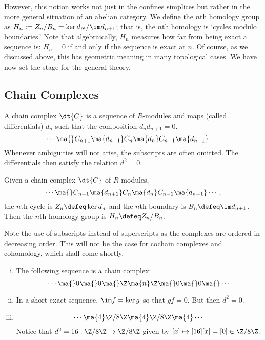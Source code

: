 However, this notion works not just in the confines simplices but rather in the more general situation of an abelian category. We define the $n$th homology group as $H_n:=Z_n/B_n=\ker d_N/\im d_{n+1}$; that is, the $n$th homology is `cycles modulo boundaries.' Note that algebraically, $H_n$ measures how far from being exact a sequence is: $H_n=0$ if and only if the sequence is exact at $n$. Of course, as we discussed above, this has geometric meaning in many topological cases. We have now set the stage for the general theory. 



\subsection{Chain Complexes} 



\begin{dfn}
A chain complex $\dt{C}$ is a sequence of $R$-modules and maps (called differentials) $d_n$ such that the composition $d_nd_{n+1}=0$.
	\[
	\cdots \ma{} C_{n+1} \ma{d_{n+1}} C_n \ma{d_n} C_{n-1} \ma{d_{n-1}} \cdots
	\]
Whenever ambiguities will not arise, the subscripts are often omitted. The differentials then satisfy the relation $d^2=0$. 
\end{dfn}


\begin{dfn}
Given a chain complex $\dt{C}$ of $R$-modules, 
	\[
	\cdots \ma{} C_{n+1} \ma{d_{n+1}} C_n \ma{d_n} C_{n-1} \ma{d_{n-1}} \cdots,
	\]
the $n$th cycle is $Z_n \defeq \ker d_n$ and the $n$th boundary is $B_n \defeq \im d_{n+1}$. Then the $n$th homology group is $H_n \defeq Z_n/B_n$. 
\end{dfn}


Note the use of subscripts instead of superscripts as the complexes are ordered in decreasing order. This will not be the case for cochain complexes and cohomology, which shall come shortly. 


\begin{ex} \hfill
	\begin{enumerate}[(i)]
	\item The following sequence is a chain complex:
		\[
		\cdots \ma{} 0 \ma{} 0 \ma{} \Z \ma{n} \Z \ma{} 0 \ma{} 0 \ma{} \cdots
		\]
	\item In a short exact sequence, $\im f =\ker g$ so that $gf=0$. But then $d^2=0$.  
	\item 
		\[
		\cdots \ma{4} \Z/8 \Z \ma{4} \Z/8\Z \ma{4} \cdots
		\]
	Notice that $d^2=16: \Z/8\Z \to \Z/8\Z$ given by $[x] \mapsto [16][x]=[0] \in \Z/8\Z$.
	\end{enumerate} \xqed 
\end{ex}


